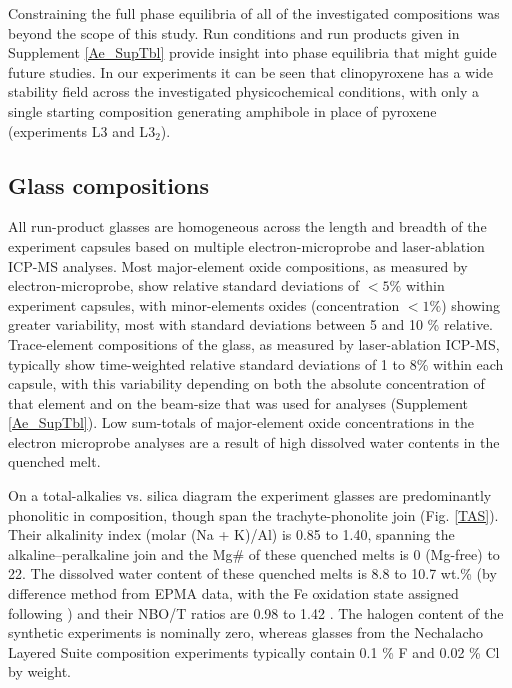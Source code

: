 \documentclass[review,authoryear,12pt]{elsarticle}
\begin{document}
Constraining the full phase equilibria of all of the investigated compositions was beyond the scope of this study. Run conditions and run products given in Supplement \ref{Ae_SupTbl} provide insight into phase equilibria that might guide future studies. In our experiments it can be seen that clinopyroxene has a wide stability field across the investigated physicochemical conditions, with only a single starting composition generating amphibole in place of pyroxene (experiments L3 and L$3_2$).

\subsection{Glass compositions}

All run-product glasses are homogeneous across the length and breadth of the experiment capsules based on multiple electron-microprobe and laser-ablation ICP-MS analyses. Most major-element oxide compositions, as measured by electron-microprobe, show relative standard deviations of $<5\%$ within experiment capsules, with minor-elements oxides (concentration $<1\%$) showing greater variability, most with standard deviations between 5 and 10 \% relative. Trace-element compositions of the glass, as measured by laser-ablation ICP-MS, typically show time-weighted relative standard deviations of 1 to 8\% within each capsule, with this variability depending on both the absolute concentration of that element and on the beam-size that was used for analyses (Supplement \ref{Ae_SupTbl}). Low sum-totals of major-element oxide concentrations in the electron microprobe analyses are a result of high dissolved water contents in the quenched melt.

On a total-alkalies vs. silica diagram the experiment glasses are predominantly phonolitic in composition, though span the trachyte-phonolite join (Fig. \ref{TAS}). 
Their alkalinity index (molar (Na + K)/Al) is 0.85 to 1.40, spanning the alkaline--peralkaline join and the Mg\# of these quenched melts is 0 (Mg-free) to 22. The dissolved water content of these quenched melts is 8.8 to 10.7 wt.\% (by difference method from EPMA data, with the Fe oxidation state assigned following \citealt{Kress1991}) and their NBO/T ratios are 0.98 to 1.42 \citep{Mysen1982,Mysen1985}. The halogen content of the synthetic experiments is nominally zero, whereas glasses from the Nechalacho Layered Suite composition experiments typically contain 0.1 \% F and 0.02 \% Cl by weight.
\end{document}
